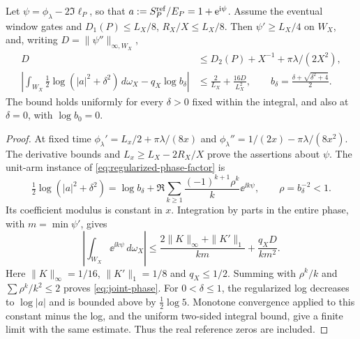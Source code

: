 \begin{lemma}\label{lem:joint-phase}
Let \(\psi=\phi_\lambda-2\Im\ell_P\), so that
\(a:=S_P^{\rm ref}/E_P=1+\mathrm e^{\mathrm i\psi}\). Assume the eventual
window gates and \(D_1(P)\le L_X/8\), \(R_X/X\le L_X/8\).
Then \(\psi'\ge L_X/4\) on \(W_X\), and, writing
\(D=\|\psi''\|_{\infty,W_X}\),
\begin{align}\label{eq:joint-phase}
 D&\le D_2(P)+X^{-1}+\pi\lambda/(2X^2),\nonumber\\
 \left|\int_{W_X}\tfrac12\log(|a|^2+\delta^2)\,d\omega_X
                   -q_X\log b_\delta\right|
 &\le\frac2{L_X}+\frac{16D}{L_X^2},
 \qquad b_\delta=\frac{\delta+\sqrt{\delta^2+4}}2.
\end{align}
The bound holds uniformly for every \(\delta>0\) fixed within
the integral, and also at \(\delta=0\), with \(\log b_0=0\).
\end{lemma}
\begin{proof}
At fixed time \(\phi_\lambda'=L_x/2+\pi\lambda/(8x)\) and
\(\phi_\lambda''=1/(2x)-\pi\lambda/(8x^2)\). The derivative
bounds and \(L_x\ge L_X-2R_X/X\) prove the assertions about \(\psi\).
The unit-arm instance of \eqref{eq:regularized-phase-factor} is
\[
 \tfrac12\log(|a|^2+\delta^2)=\log b_\delta+
  \Re\sum_{k\ge1}\frac{(-1)^{k+1}\rho^k}{k}\ee^{\ii k\psi},
 \qquad \rho=b_\delta^{-2}<1.
\]
Its coefficient modulus is constant in \(x\). Integration by parts
in the entire phase, with \(m=\min\psi'\), gives
\[
 \left|\int_{W_X}\ee^{\ii k\psi}\,d\omega_X\right|
 \le\frac{2\|K\|_\infty+\|K'\|_1}{km}
          +\frac{q_XD}{km^2}.
\]
Here \(\|K\|_\infty=1/16\), \(\|K'\|_1=1/8\) and
\(q_X\le1/2\). Summing with \(\rho^k/k\) and
\(\sum\rho^k/k^2\le2\) proves \eqref{eq:joint-phase}.
For \(0<\delta\le1\), the regularized log decreases to
\(\log|a|\) and is bounded above by \(\tfrac12\log5\).
Monotone convergence applied to this constant minus the log, and
the uniform two-sided integral bound, give a finite limit with the
same estimate. Thus the real reference zeros are included.
\end{proof}


